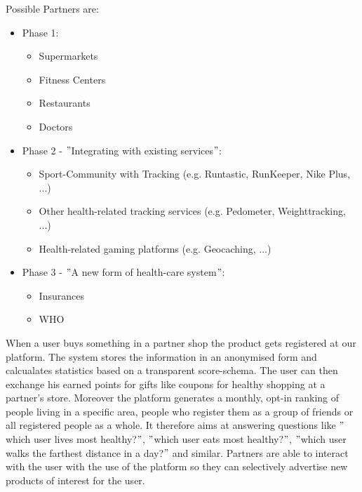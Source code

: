 \documentclass[a4paper,11pt]{article}
\begin{document}
\pagebreak

Possible Partners are:
\begin{itemize}
	\item Phase 1:
		\begin{itemize}
			\item Supermarkets
			\item Fitness Centers
			\item Restaurants
			\item Doctors
		\end{itemize}
	\item Phase 2 - $"$Integrating with existing services$"$:
		\begin{itemize}
			\item Sport-Community with Tracking (e.g. Runtastic, RunKeeper, Nike Plus, ...)
			\item Other health-related tracking services (e.g. Pedometer, Weighttracking, ...)
			\item Health-related gaming platforms (e.g. Geocaching, ...)
		\end{itemize}
	\item Phase 3 - $"$A new form of health-care system$"$:
		\begin{itemize}
			\item Insurances 
			\item WHO
		\end{itemize}
\end{itemize}

When a user buys something in a partner shop the product gets registered at our platform. The system stores the information in an anonymised form and calcualates statistics based on a transparent score-schema. The user can then exchange his earned points for gifts like coupons for healthy shopping at a partner's store. Moreover the platform generates a monthly, opt-in ranking of people living in a specific area, people who register them as a group of friends or all registered people as a whole. It therefore aims at answering questions like $"$which user lives most healthy?$"$, $"$which user eats most healthy?$"$, $"$which user walks the farthest distance in a day?$"$ and similar. Partners are able to interact with the user with the use of the platform so they can selectively advertise new products of interest for the user. \\
\end{document}
